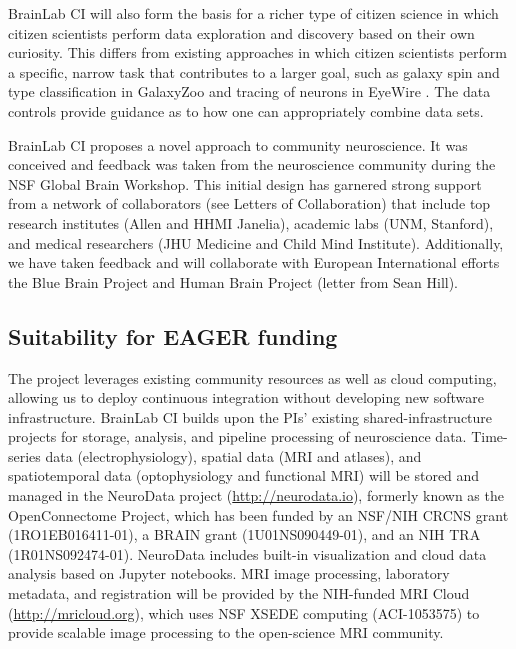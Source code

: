 BrainLab CI will also form the basis for a richer type of citizen science in which 
citizen scientists perform data exploration and discovery based on their own 
curiosity.  This differs from existing approaches in which citizen scientists 
perform a specific, narrow task that contributes to a larger goal, such as 
galaxy spin and type classification in GalaxyZoo \cite{galaxyzoo} and tracing of neurons
in EyeWire \cite{eyewire}.  The data controls provide guidance as to how one can appropriately
combine data sets. 

BrainLab CI proposes a novel approach to community neuroscience.  It was conceived and feedback 
was taken from the neuroscience community during the NSF Global Brain Workshop.  This initial
design has garnered strong support from a network of collaborators (see Letters of Collaboration) that
include top research institutes (Allen and HHMI Janelia), academic labs (UNM, Stanford), and 
medical researchers (JHU Medicine and Child Mind Institute).  Additionally, we have taken feedback 
and will collaborate with European International efforts the Blue Brain Project and Human Brain 
Project (letter from Sean Hill).



\subsection{Suitability for EAGER funding}


The project leverages existing community resources as well as cloud computing, allowing us to deploy 
continuous integration without developing new software infrastructure.
BrainLab CI builds upon the PIs' existing shared-infrastructure projects for storage, analysis, and 
pipeline processing of neuroscience data.  Time-series data 
(electrophysiology), 
spatial data (MRI and atlases), and spatiotemporal data (optophysiology and functional MRI) will be stored and managed 
in the NeuroData project (\url{http://neurodata.io}), formerly known as the OpenConnectome Project, 
which has been funded by an NSF/NIH CRCNS grant (1RO1EB016411-01), a BRAIN grant (1U01NS090449-01), 
and an NIH TRA (1R01NS092474-01).  
NeuroData includes built-in visualization and cloud data analysis based on Jupyter notebooks.  
MRI image processing, laboratory metadata, and registration will be provided by the 
NIH-funded MRI Cloud (\url{http://mricloud.org}), which uses 
NSF XSEDE computing (ACI-1053575) to provide scalable image processing to the open-science MRI community.

